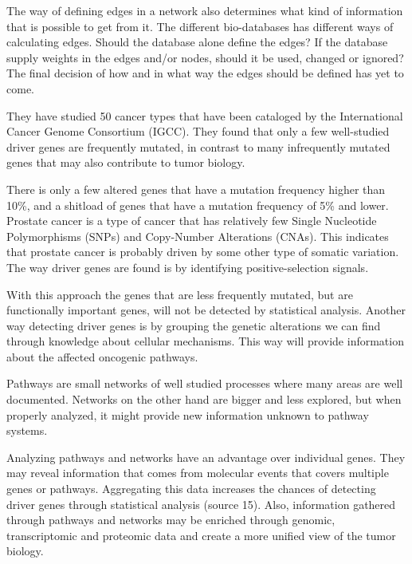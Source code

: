 \documentclass[UKenglish]{ifimaster}
\begin{document}
The way of defining edges in a network also determines what kind of information that is possible to get from it. The
different bio-databases has different ways of calculating edges. Should the database alone define the edges? If the
database supply weights in the edges and/or nodes, should it be used, changed or ignored? The final decision of how and
in what way the edges should be defined has yet to come. 

They have studied 50 cancer types that have been cataloged by the International Cancer Genome Consortium (IGCC). They
found that only a few well-studied driver genes are frequently mutated, in contrast to many infrequently mutated genes
that may also contribute to tumor biology.

There is only a few altered genes that have a mutation frequency higher than 10\%, and a shitload of genes that have a
mutation frequency of 5\% and lower.  Prostate cancer is a type of cancer that has relatively few Single Nucleotide
Polymorphisms (SNPs) and Copy-Number Alterations (CNAs). This indicates that prostate cancer is probably driven by some
other type of somatic variation. The way driver genes are found is by identifying positive-selection signals.



With this approach the genes that are less frequently mutated, but are functionally important genes, will not be
detected by statistical analysis.  Another way detecting driver genes is by grouping the genetic alterations we can find
through knowledge about cellular mechanisms. This way will provide information about the affected oncogenic pathways.

Pathways are small networks of well studied processes where many areas are well documented. Networks on the other hand
are bigger and less explored, but when properly analyzed, it might provide new information unknown to pathway systems.

Analyzing pathways and networks have an advantage over individual genes. They may reveal information that comes from
molecular events that covers multiple genes or pathways. Aggregating this data increases the chances of detecting driver
genes through statistical analysis (source 15). Also, information gathered through pathways and networks may be enriched
through genomic, transcriptomic and proteomic data and create a more unified view of the tumor biology.
\end{document}

